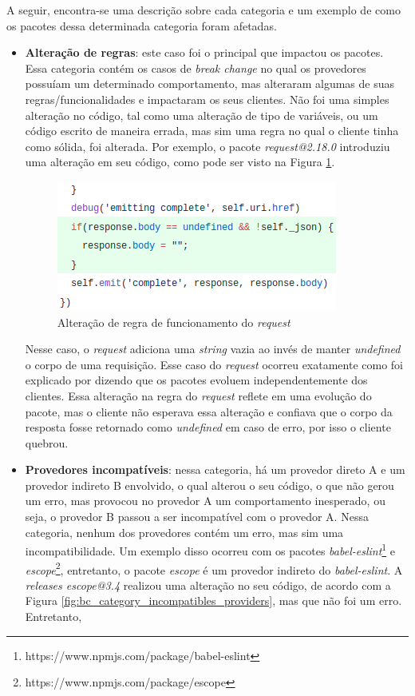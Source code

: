 A seguir, encontra-se uma descrição sobre cada categoria e um exemplo de como os pacotes dessa determinada categoria foram afetadas.

\begin{itemize}
    \item \textbf{Alteração de regras}: este caso foi o principal que impactou os pacotes. Essa categoria contém os casos de \textit{break change} no qual os provedores possuíam um determinado comportamento, mas alteraram algumas de suas regras/funcionalidades e impactaram os seus clientes. Não foi uma simples alteração no código, tal como uma alteração de tipo de variáveis, ou um código escrito de maneira errada, mas sim uma regra no qual o cliente tinha como sólida, foi alterada. Por exemplo, o pacote \textit{request@2.18.0} introduziu uma alteração em seu código, como pode ser visto na Figura \ref{fig:bc_category_change_rule_1}.

    \begin{figure}
        \centering
        \includegraphics[scale=0.6]{figuras/bc_category_change_rule_1.png}
        \caption{Alteração de regra de funcionamento do \textit{request}}
        \label{fig:bc_category_change_rule_1}
    \end{figure}{}

    Nesse caso, o \textit{request} adiciona uma \textit{string} vazia ao invés de manter \textit{undefined} o corpo de uma requisição. Esse caso do \textit{request} ocorreu exatamente como foi explicado por  dizendo que os pacotes evoluem independentemente dos clientes. Essa alteração na regra do \textit{request} reflete em uma evolução do pacote, mas o cliente não esperava essa alteração e confiava que o corpo da resposta fosse retornado como \textit{undefined} em caso de erro, por isso o cliente quebrou.

    \item \textbf{Provedores incompatíveis}: nessa categoria, há um provedor direto A e um provedor indireto B envolvido, o qual alterou o seu código, o que não gerou um erro, mas provocou no provedor A um comportamento inesperado, ou seja, o provedor B passou a ser incompatível com o provedor A. Nessa categoria, nenhum dos provedores contém um erro, mas sim uma incompatibilidade. Um exemplo disso ocorreu com os pacotes \textit{babel-eslint}\footnote{https://www.npmjs.com/package/babel-eslint} e \textit{escope}\footnote{https://www.npmjs.com/package/escope}, entretanto, o pacote \textit{escope} é um provedor indireto do \textit{babel-eslint}. A \textit{releases escope@3.4} realizou uma alteração no seu código, de acordo com a Figura \ref{fig:bc_category_incompatibles_providers}, mas que não foi um erro. Entretanto, 


\end{itemize}{}
